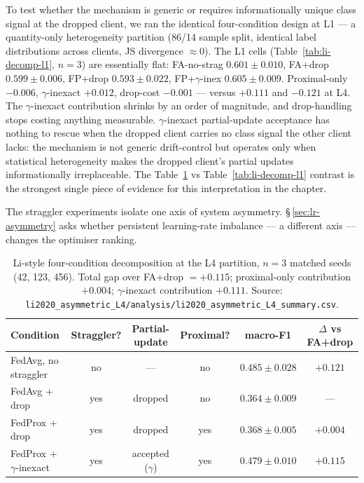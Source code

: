 \documentclass[11pt,a4paper]{report}
\begin{document}
To test whether the mechanism is generic or requires informationally unique
class signal at the dropped client, we ran the identical four-condition
design at L1 --- a quantity-only heterogeneity partition (86/14 sample
split, identical label distributions across clients, JS divergence
$\approx 0$). The L1 cells (Table~\ref{tab:li-decomp-l1}, $n=3$) are
essentially flat: FA-no-strag $0.601 \pm 0.010$, FA+drop $0.599 \pm 0.006$,
FP+drop $0.593 \pm 0.022$, FP+$\gamma$-inex $0.605 \pm 0.009$.
Proximal-only $-0.006$, $\gamma$-inexact $+0.012$, drop-cost $-0.001$ ---
versus $+0.111$ and $-0.121$ at L4. The $\gamma$-inexact contribution
shrinks by an order of magnitude, and drop-handling stops costing anything
measurable. $\gamma$-inexact partial-update acceptance has nothing to
rescue when the dropped client carries no class signal the other client
lacks: the mechanism is not generic drift-control but operates only when
statistical heterogeneity makes the dropped client's partial updates
informationally irreplaceable. The Table~\ref{tab:li-decomp-l4} vs
Table~\ref{tab:li-decomp-l1} contrast is the strongest single piece of
evidence for this interpretation in the chapter.

The straggler experiments isolate one axis of system asymmetry.
\S\,\ref{sec:lr-asymmetry} asks whether persistent learning-rate imbalance
--- a different axis --- changes the optimiser ranking.



\begin{table}[h]
\centering
\caption{Li-style four-condition decomposition at the L4 partition,
$n=3$ matched seeds (42, 123, 456). Total gap over FA+drop $= +0.115$;
proximal-only contribution $+0.004$; $\gamma$-inexact contribution $+0.111$.
Source: \texttt{li2020\_asymmetric\_L4/analysis/li2020\_asymmetric\_L4\_summary.csv}.}
\label{tab:li-decomp-l4}
\begin{tabular}{lccccc}
\hline
Condition & Straggler? & Partial-update & Proximal? & macro-F1 & $\Delta$ vs FA+drop \\
\hline
FedAvg, no straggler        & no  & ---                  & no  & $0.485 \pm 0.028$ & $+0.121$ \\
FedAvg + drop               & yes & dropped              & no  & $0.364 \pm 0.009$ & ---      \\
FedProx + drop              & yes & dropped              & yes & $0.368 \pm 0.005$ & $+0.004$ \\
FedProx + $\gamma$-inexact  & yes & accepted ($\gamma$)  & yes & $0.479 \pm 0.010$ & $+0.115$ \\
\hline
\end{tabular}
\end{table}
\end{document}
